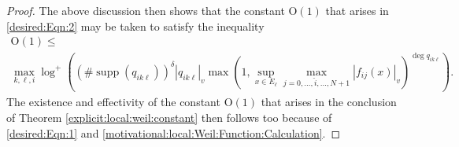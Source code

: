 \documentclass[10pt,a4paper]{amsart}
\renewcommand{\leq}{\leqslant}
\begin{document}
\begin{proof}
The above discussion then shows that the constant $\mathrm{O}(1)$ that arises in \eqref{desired:Eqn:2} may be taken to satisfy the inequality
\begin{multline*}
\mathrm{O}(1) \leq \\
\max_{k,\ell,i} \log^+ \left( \left( \# \operatorname{supp}(q_{ik\ell}) \right)^\delta |q_{ik\ell}|_v \max\left(1,\sup_{x \in E_{\ell}} \max_{j=0,\dots, \hat{i}, \dots,N+1} |f_{ij}(x)|_v\right)^{\deg q_{ik\ell}} \right) \text{.}
\end{multline*}
The existence and effectivity of the constant $\mathrm{O}(1)$ that arises in the conclusion of Theorem \ref{explicit:local:weil:constant} then follows too because of \eqref{desired:Eqn:1} and \eqref{motivational:local:Weil:Function:Calculation}.
\end{proof}
\end{document}
